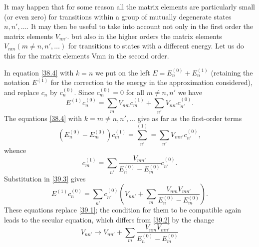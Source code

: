 It may happen that for some reason all the matrix elements are particularly small (or even zero) for transitions within a group of mutually degenerate states $ n, n', \dots $. It may then be useful to take into account not only in the first order the matrix elements $ V_{nn'} $. but also in the higher orders the matrix elements $ V_{nm} (m \ne n, n' ,\dots) $ for transitions to states with a different energy. Let us do this for the matrix elements Vmn in the second order.

In equation \eqref{38.4} with $ k = n $ we put on the left $ E = E_n^{(0)} + E_n^{(1)} $ (retaining the notation $ E^{(1)} $ for the correction to the energy in the approximation considered), and replace $ c_n $ by $ c_n^{(0)} $. Since $ c_m^{(0)} = 0 $ for all $ m \ne n, n' $ we have
\begin{equation}\label{39.3}
E^{(1)}c_n^{(0)}=\sum_{m}V_{nm}c_m^{(1)}+\sum_{n'}V_{nn'}c_{n'}^{(0)}.
\end{equation}
The equations \eqref{38.4} with $ k = m \ne n, n', \dots $ give as far as the first-order terms
\[ (E_n^{(0)}-E_m^{(0)})c_m^{(1)}=\sum_{n'}^{(1)}=\sum_{n'}V_{mn'}c_{n'}^{(0)}, \]
whence
\[ c_m^{(1)}=\sum_{n'}\frac{V_{mn'}}{E_n^{(0)}-E_m^{(0)}}c_{n'}^{(0)}. \]
Substitution in \eqref{39.3} gives
\[ E^{(1)}c_n^{(0)}=\sum_{n'}c_{n'}^{(0)}\left(V_{nn'}+\sum_{m}\frac{V_{nm}V_{mn'}}{E_n^{(0)}-E_m^{(0)}} \right). \]
These equations replace \eqref{39.1}; the condition for them to be compatible again leads to the secular equation, which differs from \eqref{39.2} by the change
\begin{equation}\label{39.4}
V_{nn'}\to V_{nn'}+\sum_{m}\frac{V_{nm}V_{mn'}}{E_n^{(0)}-E_m^{(0)}}
\end{equation}


